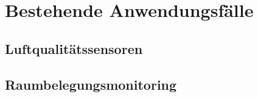 \section{Bestehende Anwendungsfälle}

\subsection{Luftqualitätssensoren}

\subsection{Raumbelegungsmonitoring}